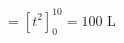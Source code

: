 \documentclass[preview]{standalone}
\begin{document}
\begin{align*}
= [t^2]_0^{10} = 100 \text{ L}
\end{align*}
\end{document}
